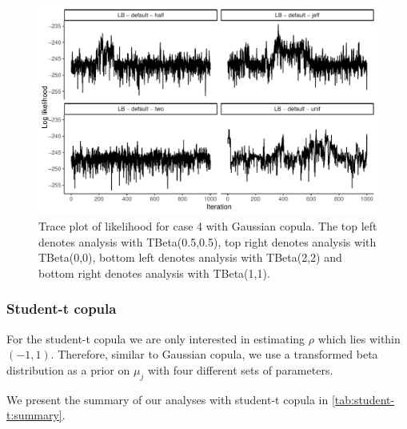 \documentclass{amsart}
\begin{document}
\begin{figure}
	\centering
	\includegraphics[width = 0.75\linewidth]{trace_case4_gauss_like.pdf}
	\caption{Trace plot of likelihood for case 4 with Gaussian copula. The top left denotes analysis with TBeta(0.5,0.5), top right denotes analysis with TBeta(0,0), bottom left denotes analysis with TBeta(2,2) and bottom right denotes analysis with TBeta(1,1).}
	\label{fig:case4:gauss:like}
\end{figure}

\subsubsection{Student-t copula} For the student-t copula we are only interested in estimating $\rho$ which lies within $(-1,1)$. Therefore, similar to Gaussian copula, we use a transformed beta distribution as a prior on $\mu_j$ with four different sets of parameters.

We present the summary of our analyses with student-t copula in \cref{tab:student-t:summary}. 
\end{document}
